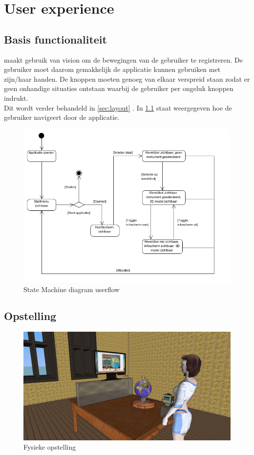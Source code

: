 \chapter{User experience} \label{cha:userexperience}

\section{Basis functionaliteit} \label{sec:basis}
\projectname maakt gebruik van vision om de bewegingen van de gebruiker te registreren. De gebruiker moet daarom gemakkelijk de applicatie kunnen gebruiken met zijn/haar handen. De knoppen moeten genoeg van elkaar verspreid staan zodat er geen onhandige situaties ontstaan waarbij de gebruiker per ongeluk knoppen indrukt.\\
Dit wordt verder behandeld in \cref{sec:layout} . In \cref{fig:statemachine1} staat weergegeven hoe de gebruiker navigeert door de applicatie.

\begin{figure}[h]
	\includegraphics[width=130mm]{figs/state_machine1.png}
	\caption{State Machine diagram userflow}
	\label{fig:statemachine1}
\end{figure}


\newpage
\section{Opstelling} \label{sec:setup}
\begin{figure}[h]
	\includegraphics[width=130mm]{figs/screen1.jpg}
	\caption{Fysieke opstelling}
	\label{fig:screen1}
\end{figure}

